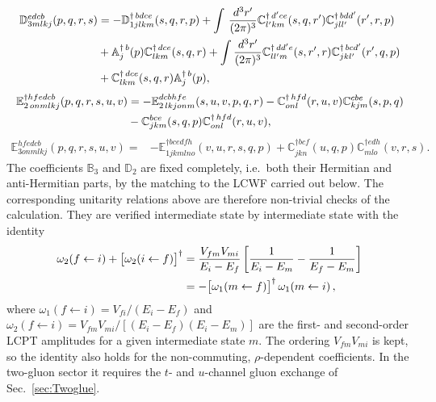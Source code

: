 \documentclass[a4paper,11pt]{article}
\def\mf#1{\mathbb{#1}}
\begin{document}
\begin{align}
     \mf{D}^{edcb}_{3mlkj}(p,q,r,s) & = -\mf{D}^{\dagger\, bdce}_{1jlkm}(s,q,r,p)+\int\, \frac{d^{3}r^{\prime}}{(2\pi)^{3}}\mf{C}^{\dagger\, d^{\prime}ce}_{l^{\prime}km}(s,q,r^{\prime})\mf{C}^{\dagger\, bdd^{\prime}}_{jll^{\prime}}(r^{\prime},r,p) \notag  \\ & + \mf{A}^{\dagger\, b}_{j}(p)\mf{C}^{\dagger\, dce}_{lkm}(s,q,r)  +\int \frac{d^{3}r^{\prime}}{(2\pi)^{3}} \mf{C}^{\dagger\, dd^{\prime}e}_{ll^{\prime}m}(s,r^{\prime},r)\mf{C}^{\dagger\, bcd^{\prime}}_{jkl^{\prime}}(r^{\prime},q,p)\notag\\ & +\mf{C}^{\dagger\, dce}_{lkm}(s,q,r)\mf{A}^{\dagger\, b}_{j}(p),
\end{align}
\begin{align}
    \mf{E}^{\dagger hfedcb}_{2\,onmlkj}(p,q,r,s,u,v) & =    - \mf{E}^{dcbhfe}_{2\,lkjonm}(s,u,v,p,q,r)-\mf{C}^{\dagger\,hfd}_{onl}(r,u,v)\mf{C}^{cbe}_{kjm}(s,p,q)\notag \\ &  - \mf{C}^{bce}_{jkm}(s,q,p)\mf{C}^{\dagger\,hfd}_{onl}(r,u,v),
\end{align}
\begin{align}
    \mf{E}^{hfedcb}_{3 onmlkj}(p,q,r,s,u,v) = &  -\mf{E}^{\dagger bcedfh}_{1jkmlno}(v,u,r,s,q,p)+\mf{C}^{\dagger bcf}_{jkn}(u,q,p)\mf{C}^{\dagger edh}_{mlo}(v,r,s).
\end{align}
{\color{chg}The coefficients $\mf{B}_{3}$ and $\mf{D}_{2}$ are fixed completely, i.e.\ both their Hermitian and anti-Hermitian parts, by the matching to the LCWF carried out below. The corresponding unitarity relations above are therefore non-trivial checks of the calculation. They are verified intermediate state by intermediate state with the identity
\begin{align}\label{eq:unitid}
\omega_{2}(f\leftarrow i)+\big[\omega_{2}(i\leftarrow f)\big]^{\dagger}&=\frac{V_{fm}V_{mi}}{E_{i}-E_{f}}\left[\frac{1}{E_{i}-E_{m}}-\frac{1}{E_{f}-E_{m}}\right]\notag\\&=-\big[\omega_{1}(m\leftarrow f)\big]^{\dagger}\,\omega_{1}(m\leftarrow i)\,,
\end{align}
where $\omega_{1}(f\leftarrow i)=V_{fi}/(E_{i}-E_{f})$ and $\omega_{2}(f\leftarrow i)=V_{fm}V_{mi}/[(E_{i}-E_{f})(E_{i}-E_{m})]$ are the first- and second-order LCPT amplitudes for a given intermediate state $m$. The ordering $V_{fm}V_{mi}$ is kept, so the identity also holds for the non-commuting, $\rho$-dependent coefficients. In the two-gluon sector it requires the $t$- and $u$-channel gluon exchange of Sec.~\ref{sec:Twoglue}.}
\end{document}
